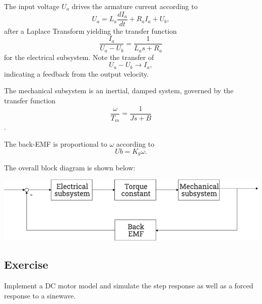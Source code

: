 \documentclass[11pt,a4paper, d]{scrartcl}
\begin{document}
The input voltage \(U_a\) drives the armature current according to
\[U_a = L_a \frac{dI_a}{dt} + R_a I_a + U_b,\] after a Laplace Transform
yielding the transfer function
\[\frac{I_a}{U_a - U_b} = \frac{1}{L_a s+R_a}\] for the electrical
subsystem. Note the transfer of \[U_a - U_b \rightarrow I_a,\]
indicating a feedback from the output velocity.

The mechanical subsystem is an inertial, damped system, governed by the
transfer function \[\frac{\omega}{T_m} = \frac{1}{Js+B}\].

The back-EMF is proportional to \(\omega\) according to
\[Ub = K_b \omega.\]

The overall block diagram is shown below:

\includegraphics{figures/DCMotorBlock.png}

    \hypertarget{exercise}{%
\subsection{Exercise}\label{exercise}}

Implement a DC motor model and simulate the step response as well as a
forced response to a sinewave.
\end{document}
